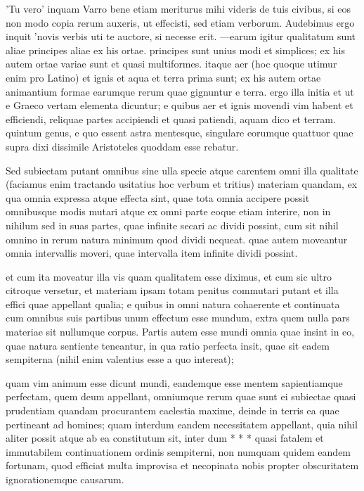  'Tu vero' inquam Varro bene etiam meriturus mihi videris de tuis civibus, si eos non modo copia rerum auxeris, ut effecisti, sed etiam verborum. Audebimus ergo inquit 'novis verbis uti te auctore, si necesse erit. —earum igitur qualitatum sunt aliae principes aliae ex his ortae. principes sunt unius modi et simplices; ex his autem ortae variae sunt et quasi multiformes. itaque aer (hoc quoque utimur enim pro Latino) et ignis et aqua et terra prima sunt; ex his autem ortae animantium formae earumque rerum quae gignuntur e terra. ergo illa initia et ut e Graeco vertam elementa dicuntur; e quibus aer et ignis movendi vim habent et efficiendi, reliquae partes accipiendi et quasi patiendi, aquam dico et terram. quintum genus, e quo essent astra mentesque, singulare eorumque quattuor quae supra dixi dissimile Aristoteles quoddam esse rebatur.

 Sed subiectam putant omnibus sine ulla specie atque carentem omni illa qualitate (faciamus enim tractando usitatius hoc verbum et tritius) materiam quandam, ex qua omnia expressa atque effecta sint, quae tota omnia accipere possit omnibusque modis mutari atque ex omni parte eoque etiam interire, non in nihilum sed in suas partes, quae infinite secari ac dividi possint, cum sit nihil omnino in rerum natura minimum quod dividi nequeat. quae autem moveantur omnia intervallis moveri, quae intervalla item infinite dividi possint.

 et cum ita moveatur illa vis quam qualitatem esse diximus, et cum sic ultro citroque versetur, et materiam ipsam totam penitus commutari putant et illa effici quae appellant qualia; e quibus in omni natura cohaerente et continuata cum omnibus suis partibus unum effectum esse mundum, extra quem nulla pars materiae sit nullumque corpus. Partis autem esse mundi omnia quae insint in eo, quae natura sentiente teneantur, in qua ratio perfecta insit, quae sit eadem sempiterna (nihil enim valentius esse a quo intereat);

 quam vim animum esse dicunt mundi, eandemque esse mentem sapientiamque perfectam, quem deum appellant, omniumque rerum quae sunt ei subiectae quasi prudentiam quandam procurantem caelestia maxime, deinde in terris ea quae pertineant ad homines; quam interdum eandem necessitatem appellant, quia nihil aliter possit atque ab ea constitutum sit, inter dum * * * quasi fatalem et immutabilem continuationem ordinis sempiterni, non numquam quidem eandem fortunam, quod efficiat multa improvisa et necopinata nobis propter obscuritatem ignorationemque causarum.

